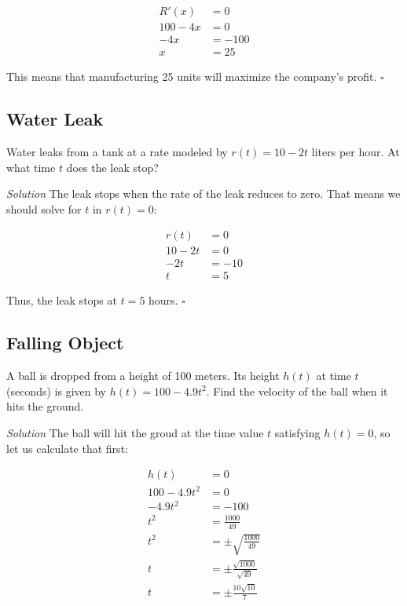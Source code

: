 \documentclass{article}
\begin{document}
\[
  \begin{split}
    R'(x) & = 0 \\
    100 - 4x & = 0 \\
    -4x & = -100 \\
    x & = 25
  \end{split}
\]

This means that manufacturing 25 units will maximize the company's profit.
\(\square\)

\subsection{Water Leak}

Water leaks from a tank at a rate modeled by \(r(t) = 10 - 2t\) liters per
hour. At what time \(t\) does the leak stop?

\textit{Solution} \: The leak stops when the rate of the leak reduces to zero.
That means we should solve for \(t\) in \(r(t) = 0\):

\[
  \begin{split}
    r(t) & = 0 \\
    10 - 2t & = 0 \\
    -2t & = -10 \\
    t & = 5
  \end{split}
\]

Thus, the leak stops at \(t = 5\) hours. \(\square\)

\subsection{Falling Object}

A ball is dropped from a height of 100 meters. Its height \(h(t)\) at time
\(t\) (seconds) is given by \(h(t) = 100 - 4.9t^2\). Find the velocity of the
ball when it hits the ground.

\textit{Solution} \: The ball will hit the groud at the time value \(t\)
satisfying \(h(t) = 0\), so let us calculate that first:

\[
  \begin{split}
    h(t) & = 0 \\
    100 - 4.9t^2 & = 0 \\
    -4.9t^2 & = -100 \\
    t^2 & = \frac{1000}{49} \\
    t^2 & = \pm\sqrt{\frac{1000}{49}} \\
    t & = \pm\frac{\sqrt{1000}}{\sqrt{49}} \\
    t & = \pm\frac{10\sqrt{10}}{7}
  \end{split}
\]
\end{document}

